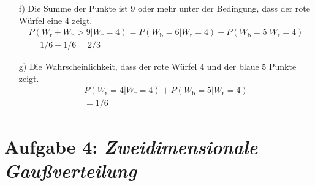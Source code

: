 \begin{itemize}
\item[f)] Die Summe der Punkte ist $9$ oder mehr unter der Bedingung, dass der rote Würfel eine $4$ zeigt.
\begin{align*}
P(W_{\text{r}} + W_{\text{b}} > 9|W_{\text{r}} = 4)
= P(W_{\text{b}} = 6|W_{\text{r}} = 4) + P(W_{\text{b}} = 5|W_{\text{r}} = 4)\\
= 1/6 + 1/6 = 2/3 
\end{align*}


\item[g)]Die Wahrscheinlichkeit, dass der rote Würfel $4$ und der blaue $5$ Punkte zeigt.
\begin{align*}
P(W_{\text{r}} = 4|W_{\text{r}} = 4) + P(W_{\text{b}} = 5|W_{\text{r}} = 4)\\
=1/6
\end{align*}
\end{itemize}

\section*{Aufgabe 4: \emph{Zweidimensionale Gaußverteilung}}

